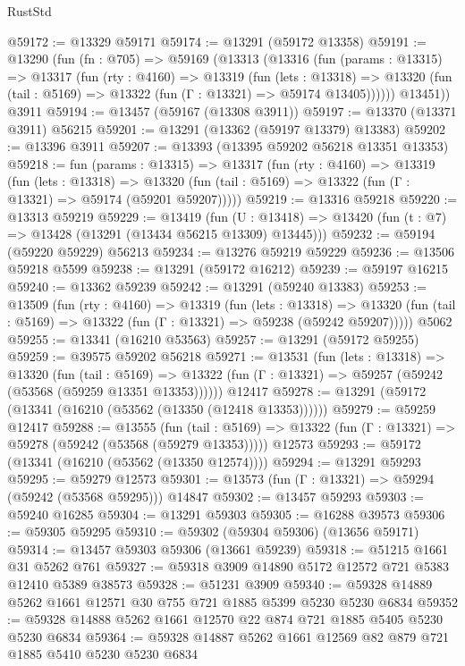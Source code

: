 \begin{lexlean}{RustStd}
\begin{coremodule}
@59172 := @13329 @59171
@59174 := @13291 (@59172 @13358)
@59191 := @13290
    (fun (fn : @705) =>
    @59169
      (@13313
        (@13316
          (fun (params : @13315) =>
          @13317
            (fun (rty : @4160) =>
            @13319
              (fun (lets : @13318) =>
              @13320 (fun (tail : @5169) => @13322 (fun (Γ : @13321) => @59174 @13405))))))
        @13451))
    @3911
@59194 := @13457 (@59167 (@13308 @3911))
@59197 := @13370 (@13371 @3911) @56215
@59201 := @13291 (@13362 (@59197 @13379) @13383)
@59202 := @13396 @3911
@59207 := @13393 (@13395 @59202 @56218 @13351 @13353)
@59218 := fun (params : @13315) =>
  @13317
    (fun (rty : @4160) =>
    @13319
      (fun (lets : @13318) =>
      @13320 (fun (tail : @5169) => @13322 (fun (Γ : @13321) => @59174 (@59201 @59207)))))
@59219 := @13316 @59218
@59220 := @13313 @59219
@59229 := @13419
    (fun (U : @13418) => @13420 (fun (t : @7) => @13428 (@13291 (@13434 @56215 @13309) @13445)))
@59232 := @59194 (@59220 @59229) @56213
@59234 := @13276 @59219 @59229
@59236 := @13506 @59218 @5599
@59238 := @13291 (@59172 @16212)
@59239 := @59197 @16215
@59240 := @13362 @59239
@59242 := @13291 (@59240 @13383)
@59253 := @13509
    (fun (rty : @4160) =>
    @13319
      (fun (lets : @13318) =>
      @13320 (fun (tail : @5169) => @13322 (fun (Γ : @13321) => @59238 (@59242 @59207)))))
    @5062
@59255 := @13341 (@16210 @53563)
@59257 := @13291 (@59172 @59255)
@59259 := @39575 @59202 @56218
@59271 := @13531
    (fun (lets : @13318) =>
    @13320
      (fun (tail : @5169) =>
      @13322 (fun (Γ : @13321) => @59257 (@59242 (@53568 (@59259 @13351 @13353))))))
    @12417
@59278 := @13291 (@59172 (@13341 (@16210 (@53562 (@13350 (@12418 @13353))))))
@59279 := @59259 @12417
@59288 := @13555
    (fun (tail : @5169) => @13322 (fun (Γ : @13321) => @59278 (@59242 (@53568 (@59279 @13353)))))
    @12573
@59293 := @59172 (@13341 (@16210 (@53562 (@13350 @12574))))
@59294 := @13291 @59293
@59295 := @59279 @12573
@59301 := @13573 (fun (Γ : @13321) => @59294 (@59242 (@53568 @59295))) @14847
@59302 := @13457 @59293
@59303 := @59240 @16285
@59304 := @13291 @59303
@59305 := @16288 @39573
@59306 := @59305 @59295
@59310 := @59302 (@59304 @59306) (@13656 @59171)
@59314 := @13457 @59303 @59306 (@13661 @59239)
@59318 := @51215 @1661 @31 @5262 @761
@59327 := @59318 @3909 @14890 @5172 @12572 @721 @5383 @12410 @5389 @38573
@59328 := @51231 @3909
@59340 := @59328 @14889 @5262 @1661 @12571 @30 @755 @721 @1885 @5399 @5230 @5230 @6834
@59352 := @59328 @14888 @5262 @1661 @12570 @22 @874 @721 @1885 @5405 @5230 @5230 @6834
@59364 := @59328 @14887 @5262 @1661 @12569 @82 @879 @721 @1885 @5410 @5230 @5230 @6834

\end{coremodule}
\end{lexlean}
